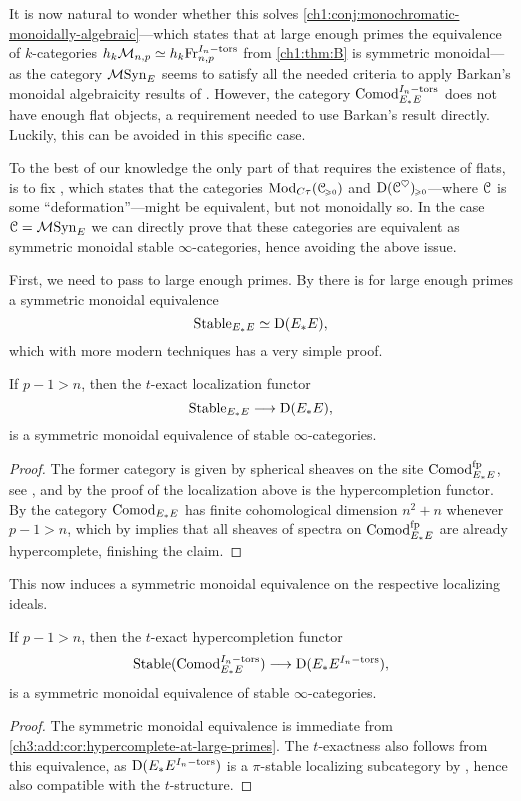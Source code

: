 It is now natural to wonder whether this solves \cref{ch1:conj:monochromatic-monoidally-algebraic}---which states that at large enough primes the equivalence of $k$-categories $h_k\mathcal{M}_{n,p} \simeq h_k\mathrm{Fr}_{n,p}^{I_n-\mathrm{tors}}$ from \cref{ch1:thm:B} is symmetric monoidal---as the category $\mathcal{M}\mathrm{Syn}_{E}$ seems to satisfy all the needed criteria to apply Barkan's monoidal algebraicity results of \cite{barkan_2023}. However, the category $\mathrm{Comod}_{E_*E}^{I_n-\mathrm{tors}}$ does not have enough flat objects, a requirement needed to use Barkan's result directly. Luckily, this can be avoided in this specific case. 

To the best of our knowledge the only part of \cite[Theorem H]{barkan_2023} that requires the existence of flats, is to fix \cite[Warning 3.30]{barkan_2023}, which states that the categories $\mathrm{Mod}_{C\tau}(\EuScript{C}_{\hspace{-1pt}\scriptscriptstyle\geqslant 0})$ and $\mathrm{D}(\EuScript{C}^\heartsuit)_{\hspace{-1pt}\scriptscriptstyle\geqslant 0}$---where $\EuScript{C}$ is some ``deformation''---might be equivalent, but not monoidally so. In the case $\EuScript{C}= \mathcal{M}\mathrm{Syn}_{E}$ we can directly prove that these categories are equivalent as symmetric monoidal stable $\infty$-categories, hence avoiding the above issue. 

First, we need to pass to large enough primes. By \cite[4.11]{barthel-heard_2018} there is for large enough primes a symmetric monoidal equivalence
\[\mathrm{Stable}_{E_*E} \simeq \mathrm{D}(E_*E),\]
which with more modern techniques has a very simple proof. 

\begin{lemma}
    \label{ch3:add:cor:hypercomplete-at-large-primes}
    If $p-1>n$, then the $t$-exact localization functor
    \[\mathrm{Stable}_{E_*E} \longrightarrow \mathrm{D}(E_*E),\]
    is a symmetric monoidal equivalence of stable $\infty$-categories.  
\end{lemma}
\begin{proof}
    The former category is given by spherical sheaves on the site $\mathrm{Comod}_{E_*E}^{\mathrm{fp}}$, see \cite[3.7]{pstragowski_2022}, and by the proof of \cite[4.54]{pstragowski_2022} the localization above is the hypercompletion functor. By \cite[2.5]{pstragowski_2021} the category $\mathrm{Comod}_{E_*E}$ has finite cohomological dimension $n^2+n$ whenever $p-1>n$, which by \cite[2.10]{clausen-mathew_2021} implies that all sheaves of spectra on $\mathrm{Comod}_{E_*E}^{\mathrm{fp}}$ are already hypercomplete, finishing the claim. 
\end{proof}

This now induces a symmetric monoidal equivalence on the respective localizing ideals. 

\begin{corollary}
    \label{ch3:add:cor:torsion-hypercomplete-at-large-primes}
    If $p-1> n$, then the $t$-exact hypercompletion functor
    \[\mathrm{Stable}(\mathrm{Comod}_{E_*E}^{I_n-\mathrm{tors}}) \longrightarrow \mathrm{D}(E_*E^{I_n-\mathrm{tors}}),\]
    is a symmetric monoidal equivalence of stable $\infty$-categories.  
\end{corollary}
\begin{proof}
    The symmetric monoidal equivalence is immediate from \cref{ch3:add:cor:hypercomplete-at-large-primes}. The $t$-exactness also follows from this equivalence, as $\mathrm{D}(E_*E^{I_n-\mathrm{tors}})$ is a $\pi$-stable localizing subcategory by \cite[3.7(2)]{barthel-heard-valenzuela_2020}, hence also compatible with the $t$-structure. 
\end{proof}

